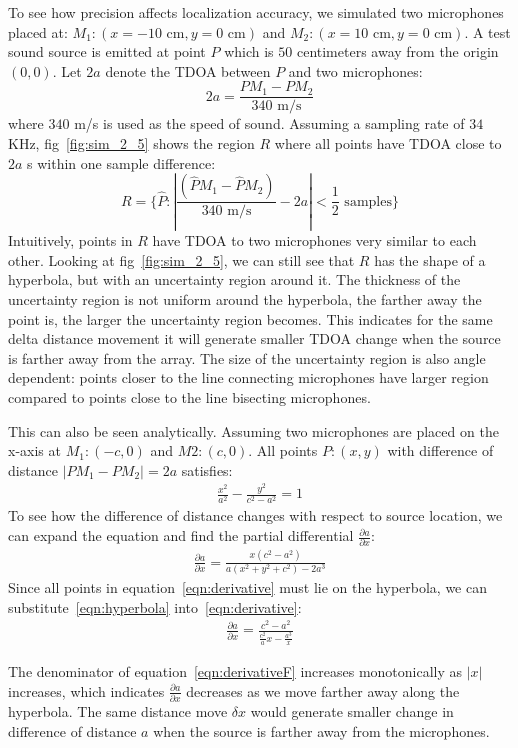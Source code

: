 To see how precision affects localization accuracy, we simulated two microphones placed at: $M_1:(x=-10\mbox{ cm},y=0\mbox{ cm})$ and $M_2:(x=10\mbox{ cm},y=0\mbox{ cm})$. A test sound source is emitted at point $P$ which is $50$ centimeters away from the origin $(0,0)$. Let $2a$ denote the TDOA between $P$ and two microphones:
\[
2a = \frac{P M_1 - P M_2}{340\mbox{ m/s}}
\]
where $340$ m/s is used as the speed of sound. Assuming a sampling rate of $34$ KHz, fig~\ref{fig:sim_2_5} shows the region $R$ where all points have TDOA close to $2a$ s within one sample difference:
\[
R=\{\hat P: |\frac{(\hat P M_1 - \hat P M_2)}{340\mbox{ m/s}} - 2a|< \frac{1}{2} \mbox{ samples}\}
\]
Intuitively, points in $R$ have TDOA to two microphones very similar to each other. Looking at fig~\ref{fig:sim_2_5}, we can still see that $R$ has the shape of a hyperbola, but with an uncertainty region around it. The thickness of the uncertainty region is not uniform around the hyperbola, the farther away the point is, the larger the uncertainty region becomes. This indicates for the same delta distance movement it will generate smaller TDOA change when the source is farther away from the array. The size of the uncertainty region is also angle dependent: points closer to the line connecting microphones have larger region compared to points close to the line bisecting microphones. 

This can also be seen analytically. Assuming two microphones are placed on the x-axis at $M_1:(-c,0)$ and $M2:(c,0)$. All points $P:(x,y)$ with difference of distance $ |PM_1 - PM_2| = 2a$ satisfies:
\begin{eqnarray}\label{eqn:hyperbola}
\frac{x^2}{a^2} - \frac{y^2}{c^2-a^2} = 1
\end{eqnarray}
To see how the difference of distance changes with respect to source location, we can expand the equation and find the partial differential $\frac{\partial a}{\partial x}$:
\begin{eqnarray}\label{eqn:derivative}
\frac{\partial a}{\partial x} = \frac{x(c^2-a^2)}{a(x^2+y^2+c^2)-2a^3}
\end{eqnarray}
Since all points in equation~\ref{eqn:derivative} must lie on the hyperbola, we can substitute~\ref{eqn:hyperbola} into~\ref{eqn:derivative}:
\begin{eqnarray}\label{eqn:derivativeF}
\frac{\partial a}{\partial x} = \frac{c^2-a^2}{\frac{c^2}{a}x - \frac{a^3}{x}}
\end{eqnarray}

The denominator of equation~\ref{eqn:derivativeF} increases monotonically as $|x|$ increases, which indicates $\frac{\partial a}{\partial x}$ decreases as we move farther away along the hyperbola. The same distance move $\delta x$ would generate smaller change in difference of distance $a$ when the source is farther away from the microphones. 


